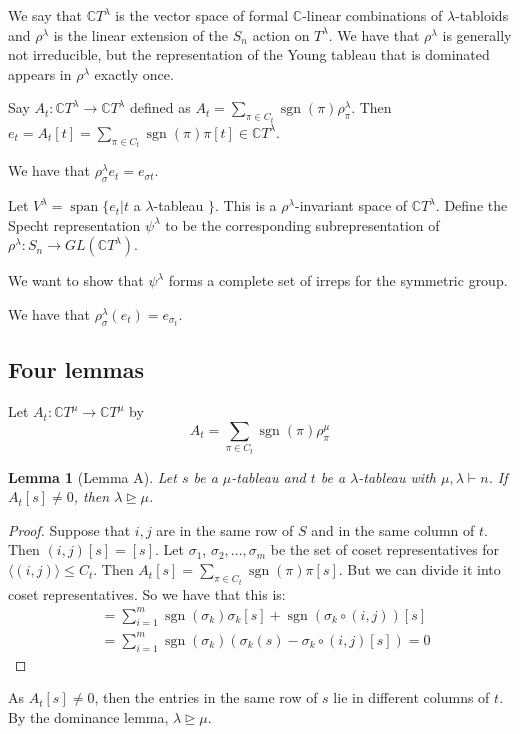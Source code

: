 \documentclass[]{report}
\newtheorem{lemma}[theorem]{Lemma}
\theoremstyle{definition}
\numberwithin{theorem}{section}
\numberwithin{equation}{section}
\newcommand{\Span}{\operatorname{span}}
\newcommand{\sgn}{\operatorname{sgn}}
\begin{document}
We say that $\mathbb{C} T^\lambda$ is the vector space of formal $\mathbb{C}$-linear combinations of $\lambda$-tabloids and $\rho^\lambda$ is the linear extension of the $S_n$ action on $T^\lambda$. We have that $\rho^\lambda$ is generally not irreducible, but the representation of the Young tableau that is dominated appears in $\rho^\lambda$ exactly once. 

Say $A_t : \mathbb{C}T^\lambda \rightarrow  \mathbb{C}T^\lambda$ defined as $A_t = \sum_{\pi \in C_t} \sgn(\pi) \rho^\lambda_\pi$. 
Then $e_t = A_t[t] = \sum_{\pi \in C_t} \sgn(\pi) \pi[t] \in \mathbb{C} T^\lambda$. 

We have that $\rho_\sigma^\lambda e_t = e_{\sigma t}$.

Let $V^\lambda = \Span \lbrace e_t | t$ a $\lambda$-tableau $\rbrace$. This is a $\rho^\lambda$-invariant space of $\mathbb{C} T^\lambda$. Define the Specht representation $\psi^\lambda$ to be the corresponding subrepresentation of $\rho^\lambda: S_n \rightarrow GL(\mathbb{C} T^\lambda)$. 

We want to show that $\psi^\lambda$ forms a complete set of irreps for the symmetric group. 

We have that $\rho^\lambda_\sigma(e_t) = e_{\sigma_t}$. 



\subsection{Four lemmas}
Let $A_t : \mathbb{C}T^\mu \rightarrow \mathbb{C} T^\mu$ by 
\begin{equation}
	A_t = \sum_{\pi \in C_t} \sgn(\pi) \rho^\mu_\pi
\end{equation}

\begin{lemma}[Lemma A]
	Let $s$ be a $\mu$-tableau and $t$ be a $\lambda$-tableau with $\mu, \lambda \vdash n$. If $A_t[s] \neq 0$, then $\lambda \unrhd \mu$. 
\end{lemma}
\begin{proof}
	Suppose that $i, j$ are in the same row of $S$ and in the same column of $t$. Then $(i, j)[s] = [s]$. Let $\sigma_1$, $\sigma_2, ..., \sigma_m$ be the set of coset representatives for $\langle (i, j) \rangle \leq C_t$. Then $A_t[s] = \sum_{\pi \in C_t} \sgn(\pi) \pi[s]$.
	But we can divide it into coset representatives. So we have that this is:
	\begin{align*}
		&= \sum_{i = 1}^m   \sgn(\sigma_k)  \sigma_k[s] + \sgn(\sigma_k \circ (i, j)) [s]\\
		&= \sum_{i = 1}^m   \sgn(\sigma_k) (\sigma_k(s) - \sigma_k \circ(i,j) [s]) = 0
	\end{align*}
\end{proof}
As $A_t[s] \neq 0$, then the entries in the same row of $s$ lie in different columns of $t$. By the dominance lemma, $\lambda \unrhd \mu$. 
\end{document}
